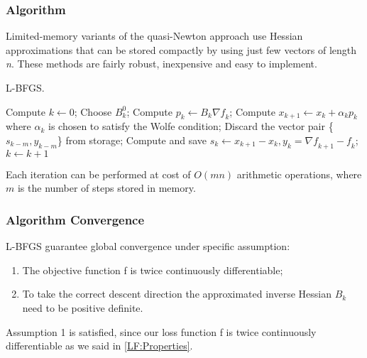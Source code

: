 \subsubsection{Algorithm}
Limited-memory variants  of  the  quasi-Newton  approach use  Hessian  approximations  that  can  be stored compactly by using just few vectors of length \textit{n}. These methods are fairly robust, inexpensive and easy to implement.

\begin{algorithm}[H]
	\caption{L-BFGS.}
	\label{alg:LBFGS}
	\begin{algorithmic}[4]
		\State Compute $k \gets 0$;
		\Repeat
		\State Choose \textbf{$B^0_k$};
		\State Compute $p_k \gets B_k\nabla \textit{f}_k$;
		\State Compute $x_{k+1} \gets x_{k}+ \alpha_{k}p_{k}$ where $\alpha_{k}$ is chosen to satisfy the Wolfe condition;
		\State Discard the vector pair \{$s_{k-m},y_{k-m}$\} from storage;
		\EndIf
		\State Compute and save $s_k \gets x_{k+1}-x_{k}, y_k=\nabla \textit{f}_{k+1}-\textit{f}_k$;
		\State $k \gets k+1$
		\EndProcedure 
	\end{algorithmic}
\end{algorithm}

Each iteration can be performed at cost of $O(mn)$ arithmetic operations, where $m$ is the number of steps stored in memory.

\subsubsection{Algorithm Convergence}

L-BFGS guarantee global convergence under specific assumption:
\begin{enumerate} \label{convergence:assumption}
	\item The objective function f is twice continuously differentiable;
	\item To take the correct descent direction the approximated inverse Hessian $B_{k}$ need to be positive definite.
\end{enumerate}


Assumption 1 is satisfied, since our loss function f is twice continuously differentiable as we said in \ref{LF:Properties}. 

